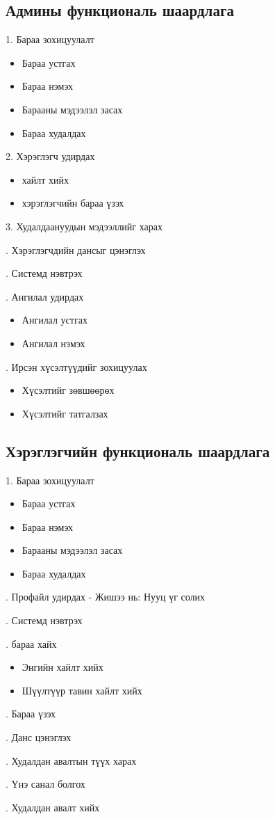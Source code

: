     \subsection{Админы функциональ шаардлага}
    1. Бараа зохицуулалт
    \begin{itemize}
    \item Бараа устгах
    \item Бараа нэмэх 
    \item Барааны мэдээлэл засах
    \item Бараа худалдах
\end{itemize}
      2. Хэрэглэгч удирдах
    \begin{itemize}
    \item хайлт хийх 
    \item хэрэглэгчийн бараа үзэх
    \end{itemize}
    3. Худалдаануудын мэдээллийг харах
    \par{}. Хэрэглэгчдийн дансыг цэнэглэх
    \par{}. Системд нэвтрэх
    \par{}. Ангилал удирдах
    \begin{itemize}
    \item Ангилал устгах
    \item Ангилал нэмэх 
\end{itemize}
   \par{}. Ирсэн хүсэлтүүдийг зохицуулах
   \begin{itemize}
    \item Хүсэлтийг зөвшөөрөх
    \item Хүсэлтийг татгалзах 
\end{itemize}
    \subsection{Хэрэглэгчийн функциональ шаардлага}
    1. Бараа зохицуулалт
    \begin{itemize}
    \item Бараа устгах
    \item Бараа нэмэх 
    \item Барааны мэдээлэл засах
    \item Бараа худалдах
\end{itemize}
     \par{}. Профайл удирдах - Жишээ нь: Нууц үг солих 
     \par{}. Системд нэвтрэх
     \par{}. бараа хайх
     \begin{itemize}
    \item Энгийн хайлт хийх
    \item Шүүлтүүр тавин хайлт хийх
\end{itemize}
     \par{}. Бараа үзэх
     \par{}. Данс цэнэглэх
     \par{}. Худалдан авалтын түүх харах
     \par{}. Үнэ санал болгох
     \par{}.  Худалдан авалт хийх 
